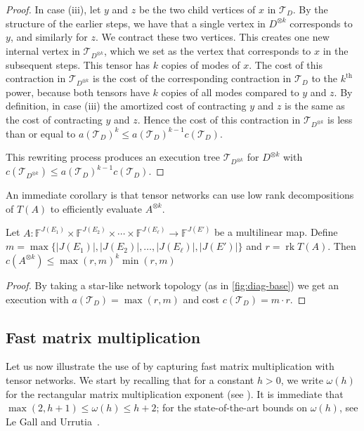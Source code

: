 \documentclass{toc}
\newcommand{\rk}{\ensuremath{\operatorname{rk}}}
\newcommand{\F}{\ensuremath{\mathbb{F}}}
\newcommand{\td}{\ensuremath{\mathcal{T}_D}}
\newcommand{\tdk}{\ensuremath{\mathcal{T}_{D^{\otimes k}}}}
\begin{document}
\begin{proof}
In case (iii), let $y$ and $z$ be the two child vertices of $x$ in $\td$.
By the structure of the earlier steps, we have that a single vertex in
$D^{\otimes k}$ corresponds to $y$,
and similarly for $z$. We contract these two vertices. This creates one new
internal vertex in $\tdk$, which we set as the vertex that corresponds
to $x$ in the subsequent steps. This tensor has $k$ copies of modes of $x$. The cost of this contraction in $\tdk$ is the cost of the corresponding contraction in $\td$ to the $k^\text{th}$ power, because both tensors have $k$ copies of all modes compared to $y$ and $z$. By definition, in case (iii) the amortized cost of contracting $y$ and $z$ is the same as the cost of contracting $y$ and $z$. Hence the cost of this contraction in $\tdk$ is less than or equal to $a(\td)^k \leq a(\td)^{k-1} c(\td)$.

This rewriting process produces an execution tree $\tdk$
for $D^{\otimes k}$ with $c(\tdk)\leq a(\td)^{k-1} c(\td)$.
\end{proof}

An immediate corollary is that tensor networks can use low rank
decompositions of $T(A)$ to efficiently evaluate $A^{\otimes k}$.

\begin{corollary}
  \label{cor:low rank execution}
  Let $A: \F^{J(E_1)} \times \F^{J(E_2)} \times \cdots \times
  \F^{J(E_\ell)} \rightarrow \F^{J(E')}$ be a multilinear map.  Define
  $m \!=\! \max\{|J(E_1)|, |J(E_2)|, \ldots, |J(E_\ell)|, |J(E')|\}$ and
  $r = \rk T(A)$.  Then $c(A^{\otimes k}) \le \max(r, m)^{k} \min(r, m)$
\end{corollary}

\begin{proof}
  By taking a star-like network topology (as in \eqref{fig:diag-base})
  we get an execution with $a(\td) = \max(r, m)$ and cost $c(\td) = m \cdot
  r$.
\end{proof}



\subsection{Fast matrix multiplication}
\label{sec:matrix mul upper bound}

Let us now illustrate the use of  by capturing
fast matrix multiplication with tensor networks. We start by recalling that
for a constant $h>0$, we write $\omega(h)$ for the rectangular matrix
multiplication exponent
(see ). %
It is immediate that
$\max(2,h+1)\leq\omega(h)\leq h+2$; for the state-of-the-art bounds
on $\omega(h)$,
see Le Gall and Urrutia~\cite{LeGallU2017}. %
\end{document}
